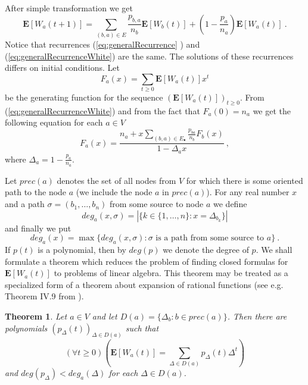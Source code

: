 \documentclass[submission]{dmtcs}
\newtheorem{theorem}{Theorem}
\newcommand{\E}[1]{\mathbf{E}\left[#1\right]}
\begin{document}
After simple transformation we get
\begin{equation}
\label{eq:generalRecurrenceWhite}
\E{W_a(t+1)} = 
\sum_{(b,a)\in E} \frac{p_{b,a}}{n_b} \E{W_b(t)} +
\left(1-\frac{p_a}{n_a}\right) \E{W_a(t)}~.
\end{equation}
Notice that recurrences (\ref{eq:generalRecurrence} ) and 
(\ref{eq:generalRecurrenceWhite}) are the same. 
The solutions of these recurrences
differs on initial conditions.
Let
$$
  F_a(x) = \sum_{t\geq 0} \E{W_a(t)} x^t
$$
be the generating function for the sequence $(\E{W_a(t)})_{t\geq 0}$.
From (\ref{eq:generalRecurrenceWhite}) and from the fact that $F_a(0)=n_a$ we get the following equation 
for each $a\in V$
$$
  F_a(x) = \frac{n_a + x \sum_{(b,a)\in E_{\bullet}} \frac{p_{ba}}{n_b} F_b(x)}{1 - \Delta_a x} ~,
$$
where $\Delta_a = 1 - \frac{p_a}{n_a}$.

Let $prec(a)$ denotes the set of all nodes from $V$ for which there is some oriented path
to the node $a$ (we include the node $a$ in $prec(a)$). For any real number
$x$ and a path $\sigma=(b_1,\ldots,b_n)$ from some source to node $a$ 
we define 
$$
 deg_a(x,\sigma) = |\{k \in \{1,\ldots,n\}:x=\Delta_{b_k}\}| 
$$
and finally we put 
$$
  deg_a(x) = \max\{deg_a(x,\sigma): \sigma \mbox{ is a path from some source to } a\}~.
$$
If $p(t)$ is a polynomial, then by $deg(p)$ we denote the degree of $p$.
We shall formulate a theorem which reduces the problem of finding closed formulas
for $\E{W_a(t)}$ to problems of linear algebra.
This theorem may be treated as a specialized 
form of a theorem about expansion of rational functions 
(see e.g. Theorem IV.9 from \cite{FLA}).

\begin{theorem}
\label{thm:toLineraAlgebra}
Let $a\in V$ and let $D(a) = \{\Delta_b: b \in prec(a)\}$. 
Then there are polynomials
$(p_{\Delta}(t))_{\Delta \in D(a)}$ such that 
$$
	(\forall t\geq 0)\left(
	\E{W_a(t)} = \sum_{\Delta \in D(a)} p_{\Delta}(t) \Delta^t
	\right)
$$
and $deg(p_{\Delta}) < deg_a(\Delta)$ 
for each $\Delta\in D(a)$.
\end{theorem}
\end{document}
